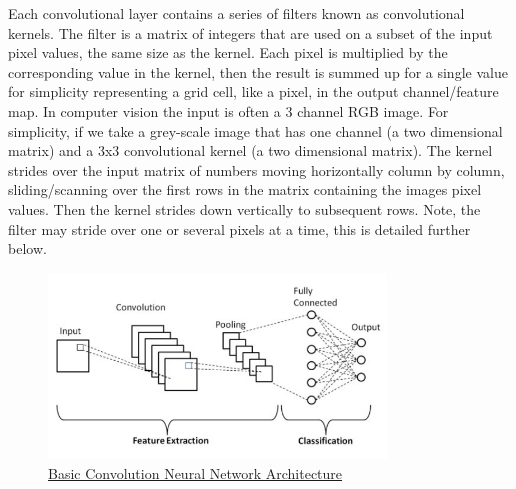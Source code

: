 Each convolutional layer contains a series of filters known as convolutional kernels. The filter is a matrix of integers that are used on a subset of the input pixel values, the same size as the kernel. Each pixel is multiplied by the corresponding value in the kernel, then the result is summed up for a single value for simplicity representing a grid cell, like a pixel, in the output channel/feature map. In computer vision the input is often a 3 channel RGB image. For simplicity, if we take a grey-scale image that has one channel (a two dimensional matrix) and a 3x3 convolutional kernel (a two dimensional matrix). The kernel strides over the input matrix of numbers moving horizontally column by column, sliding/scanning over the first rows in the matrix containing the images pixel values. Then the kernel strides down vertically to subsequent rows. Note, the filter may stride over one or several pixels at a time, this is detailed further below.


 \begin{figure}[h]
	\centering
	\includegraphics[width=0.8\textwidth]{figures/background/CNN.png}
	\captionsetup{labelformat=empty}
	\caption{\href{https://www.researchgate.net/publication/336805909/figure/fig1/AS:817888827023360@1572011300751/Schematic-diagram-of-a-basic-convolutional-neural-network-CNN-architecture-26.ppm}
	{Basic Convolution Neural Network Architecture}}
\end{figure}
